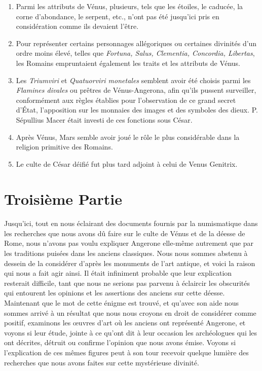 \documentclass[a4paper, 11pt, oneside, polutonikogreek, french]{article}
\begin{document}
\begin{enumerate}
    \item Parmi les attributs de Vénus, plusieurs, tels que les étoiles, le caducée, la corne d'abondance, le serpent, etc., n'ont pas été jusqu'ici pris en considération comme ils devaient l'être.

    \item Pour représenter certains personnages allégoriques ou certaines divinités d'un ordre moins élevé, telles que \emph{Fortuna, Salus, Clementia, Concordia, Libertas}, les Romains empruntaient également les traits et les attributs de Vénus.

    \item Les \emph{Triumviri} et \emph{Quatuorviri monetales} semblent avoir été choisis parmi les \emph{Flamines divales} ou prêtres de Vénus-Angerona, afin qu'ils pussent surveiller, conformément aux règles établies pour l'observation de ce grand secret d'État, l'apposition sur les monnaies des images et des symboles des dieux. P. Sépullius Macer était investi de ces fonctions sous César.

    \item Après Vénus, Mars semble avoir joué le rôle le plus considérable dans la religion primitive des Romains.

    \item Le culte de César déifié fut plus tard adjoint à celui de Venus Genitrix.
\end{enumerate}
\clearpage
\section{Troisième Partie}
\paragraph{}
Jusqu'ici, tout en nous éclairant des documents fournis par la numismatique dans les recherches que nous avons dû faire sur le culte de Vénus et de la déesse de Rome, nous n'avons pas voulu expliquer Angerone elle-même autrement que par les traditions puisées dans les anciens classiques. Nous nous sommes abstenu à dessein de la considérer d'après les monuments de l'art antique, et voici la raison qui nous a fait agir ainsi. Il était infiniment probable que leur explication resterait difficile, tant que nous ne serions pas parvenu à éclaircir les obscurités qui entourent les opinions et les assertions des anciens sur cette déesse. Maintenant que le mot de cette énigme est trouvé, et qu'avec son aide nous sommes arrivé à un résultat que nous nous croyons en droit de considérer comme positif, examinons les œuvres d'art où les anciens ont représenté Angerone, et voyons si leur étude, jointe à ce qu'ont dit à leur occasion les archéologues qui les ont décrites, détruit ou confirme l'opinion que nous avons émise. Voyons si l'explication de ces mêmes figures peut à son tour recevoir quelque lumière des recherches que nous avons faites sur cette mystérieuse divinité.
\end{document}

